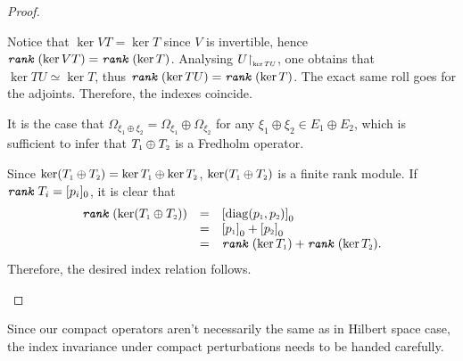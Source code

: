 \begin{proposicao}
\begin{proof}
\begin{itroman}
\item Notice that $\ker VT = \ker T$ since $V$ is invertible, hence $\texttt{\textit{rank}}\,(\ker VT) = \texttt{\textit{rank}}\,(\ker T)$. Analysing $U\sub\restrita{\ker TU}$, one obtains that $\ker TU \simeq \ker T$, thus $\texttt{\textit{rank}}\,(\ker TU) = \texttt{\textit{rank}}\,(\ker T)$. The exact same roll goes for the adjoints. Therefore, the indexes coincide.
\item  It is the case that $\Omega_{\xi_1 \oplus \xi_2} = \Omega_{\xi_1} \oplus \Omega_{\xi_2}$ for any $\xi_1\oplus \xi_2 \in E_1\oplus E_2$, which is sufficient to infer that $\sub{T}{1}\oplus \sub{T}{2}$ is a Fredholm operator.

Since $\ker(\sub{T}{1} \oplus \sub{T}{2}) = \ker \sub{T}{1} \oplus \ker \sub{T}{2}$, $\ker(\sub{T}{1} \oplus \sub{T}{2})$ is a finite rank module. If $\texttt{\textit{rank}}\, T_i = [p_i]_0$, it is clear that 
$$
\begin{array}{rcl}
    \rank(\ker(\sub{T}{1}\oplus \sub{T}{2})) &=& \left[\diag(\sub p1, \sub p2)\right]_0 \\
    &=& \left[\sub p1\right]_0+ \left[\sub p2\right]_0 \\
    &=& \rank(\ker \sub{T}{1}) + \rank(\ker \sub{T}{2}).
\end{array}
$$
Therefore, the desired index relation follows.
\qedhere
\end{itroman}
\end{proof}
\end{proposicao}

Since our compact operators aren't necessarily the same as in Hilbert space case, the index invariance under compact perturbations needs to be handed carefully. 


